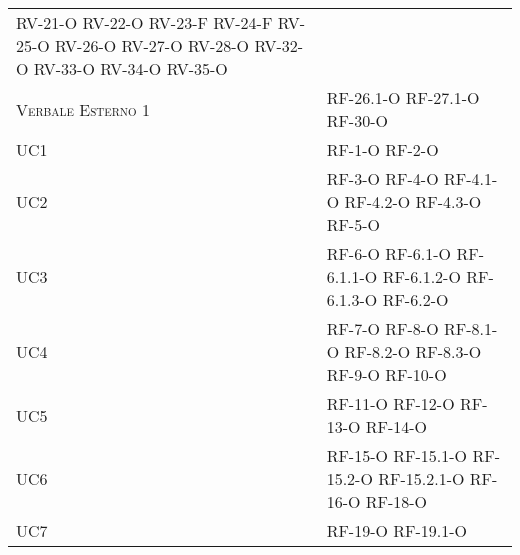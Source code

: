 \begin{longtable}{ 
		>{}p{} 
		>{}p{} }
	RV-21-O	\newline
	RV-22-O	\newline
	RV-23-F	\newline
	RV-24-F	\newline
	RV-25-O	\newline
	RV-26-O	\newline
	RV-27-O	\newline
	RV-28-O	\newline
	RV-32-O	\newline
	RV-33-O	\newline
	RV-34-O	\newline
	RV-35-O	\tabularnewline
\textsc{Verbale Esterno 1} &	RF-26.1-O	\newline
	RF-27.1-O	\newline
	RF-30-O	\tabularnewline
UC1 &	RF-1-O	\newline
	RF-2-O	\tabularnewline
UC2 &	RF-3-O	\newline
	RF-4-O	\newline
	RF-4.1-O	\newline
	RF-4.2-O	\newline
	RF-4.3-O	\newline
	RF-5-O	\tabularnewline
UC3 &	RF-6-O	\newline
	RF-6.1-O	\newline
	RF-6.1.1-O	\newline
	RF-6.1.2-O	\newline
	RF-6.1.3-O	\newline
	RF-6.2-O	\tabularnewline
UC4 &	RF-7-O	\newline
	RF-8-O	\newline
	RF-8.1-O	\newline
	RF-8.2-O	\newline
	RF-8.3-O	\newline
	RF-9-O	\newline
	RF-10-O	\tabularnewline
UC5 &	RF-11-O	\newline
	RF-12-O	\newline
	RF-13-O	\newline
	RF-14-O	\tabularnewline
UC6 &	RF-15-O	\newline
	RF-15.1-O	\newline
	RF-15.2-O	\newline
	RF-15.2.1-O	\newline
	RF-16-O	\newline
	RF-18-O	\tabularnewline
UC7 &	RF-19-O	\newline
	RF-19.1-O	\newline

\end{longtable}
